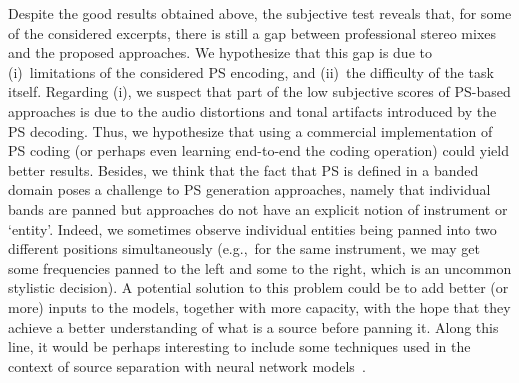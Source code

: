 \documentclass{article}
\begin{document}
Despite the good results obtained above, the subjective test reveals that, for some of the considered excerpts, there is still a gap between professional stereo mixes and the proposed approaches. We hypothesize that this gap is due to (i)~limitations of the considered PS encoding, and (ii)~the difficulty of the task itself. 
Regarding (i), we suspect that part of the low subjective scores of PS-based approaches is due to the audio distortions and tonal artifacts introduced by the PS decoding.
Thus, we hypothesize that using a commercial implementation of PS coding (or perhaps even learning end-to-end the coding operation) could yield better results. 
Besides, we think that the fact that PS is defined in a banded domain poses a challenge to PS generation approaches, namely that individual bands are panned but approaches do not have an explicit notion of instrument or `entity'. Indeed, we sometimes observe individual entities being panned into two different positions simultaneously (e.g.,~for the same instrument, we may get some frequencies panned to the left and some to the right, which is an uncommon stylistic decision). 
A potential solution to this problem could be to add better (or more) inputs to the models, together with more capacity, with the hope that they achieve a better understanding of what is a source before panning it. Along this line, it would be perhaps interesting to include some techniques used in the context of source separation with neural network models~\cite{cano2018musical}. 
\end{document}
